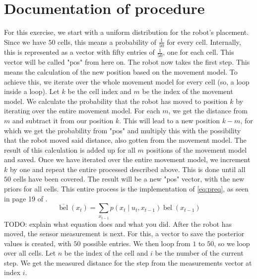 \documentclass[11pt]{article}
\begin{document}
    \section{Documentation of procedure}\label{sec:proc}

    For this exercise, we start with a uniform distribution for the robot's placement.
    Since we have $50$ cells, this means a probability of $\frac{1}{50}$ for every cell.
    Internally, this is represented as a vector with fifty entries of $\frac{1}{50}$, one for each cell.
    This vector will be called "pos" from here on.
    The robot now takes the first step.
    This means the calculation of the new position based on the movement model.\newline
    To achieve this, we iterate over the whole movement model for every cell (so, a loop inside a loop).
    Let $k$ be the cell index and $m$ be the index of the movement model.
    We calculate the probability that the robot has moved to position $k$ by iterating over the entire movement model.
    For each $m$, we get the distance from $m$ and subtract it from our position $k$.
    This will lead to a new position $k-m$, for which we get the probability from "pos" and multiply this with the possibility that the robot moved said distance, also gotten from the movement model.
    The result of this calculation is added up for all $m$ positions of the movement model and saved.\newline
    Once we have iterated over the entire movement model, we increment $k$ by one and repeat the entire processed described above.
    This is done until all $50$ cells have been covered.
    The result will be a new "pos" vector, with the new priors for all cells.
    This entire process is the implementation of \autoref{eq:preq}, as seen in page 19 of \textcite{merz_autonome_2}.
    \begin{equation}\label{eq:preq}
        \overline{\operatorname{bel}}\left(x_{t}\right)=\sum_{x_{t-1}} p\left(x_{t} \mid u_{t}, x_{t-1}\right) \operatorname{bel}\left(x_{t-1}\right)
    \end{equation}
    TODO: explain what equation does and what you did.\newline
    After the robot has moved, the sensor measurement is next.
    For this, a vector to save the posterior values is created, with $50$ possible entries.
    We then loop from $1$ to $50$, so we loop over all cells.
    Let $n$ be the index of the cell and $i$ be the number of the current step.
    We get the measured distance for the step from the measurements vector at index $i$.
\end{document}

